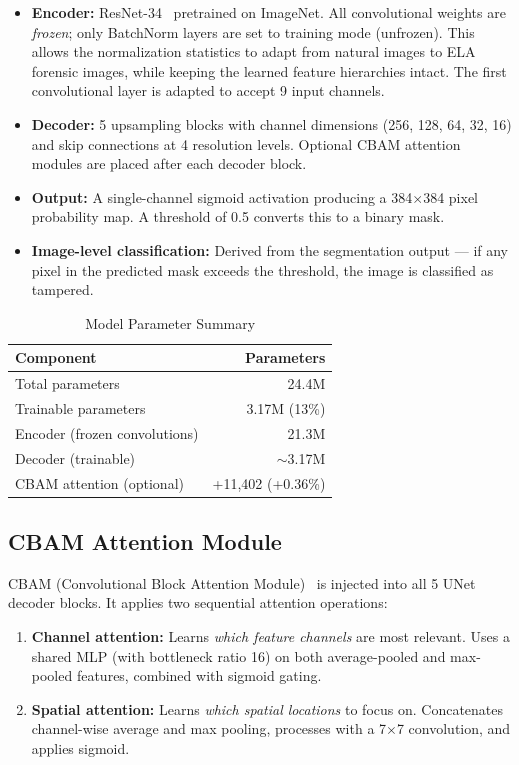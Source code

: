 \documentclass[conference]{IEEEtran}
\begin{document}
\begin{itemize}
    \item \textbf{Encoder:} ResNet-34~\cite{he2016resnet} pretrained on ImageNet. All convolutional weights are \textit{frozen}; only BatchNorm layers are set to training mode (unfrozen). This allows the normalization statistics to adapt from natural images to ELA forensic images, while keeping the learned feature hierarchies intact. The first convolutional layer is adapted to accept 9 input channels.
    \item \textbf{Decoder:} 5 upsampling blocks with channel dimensions (256, 128, 64, 32, 16) and skip connections at 4 resolution levels. Optional CBAM attention modules are placed after each decoder block.
    \item \textbf{Output:} A single-channel sigmoid activation producing a 384$\times$384 pixel probability map. A threshold of 0.5 converts this to a binary mask.
    \item \textbf{Image-level classification:} Derived from the segmentation output --- if any pixel in the predicted mask exceeds the threshold, the image is classified as tampered.
\end{itemize}

\begin{table}[H]
\centering
\caption{Model Parameter Summary}
\label{tab:params}
\begin{tabular}{l r}
\toprule
\textbf{Component} & \textbf{Parameters} \\
\midrule
Total parameters & 24.4M \\
Trainable parameters & 3.17M (13\%) \\
Encoder (frozen convolutions) & 21.3M \\
Decoder (trainable) & $\sim$3.17M \\
CBAM attention (optional) & +11,402 (+0.36\%) \\
\bottomrule
\end{tabular}
\end{table}


\subsection{CBAM Attention Module}

CBAM (Convolutional Block Attention Module)~\cite{woo2018cbam} is injected into all 5 UNet decoder blocks. It applies two sequential attention operations:

\begin{enumerate}
    \item \textbf{Channel attention:} Learns \textit{which feature channels} are most relevant. Uses a shared MLP (with bottleneck ratio 16) on both average-pooled and max-pooled features, combined with sigmoid gating.
    \item \textbf{Spatial attention:} Learns \textit{which spatial locations} to focus on. Concatenates channel-wise average and max pooling, processes with a 7$\times$7 convolution, and applies sigmoid.
\end{enumerate}
\end{document}
